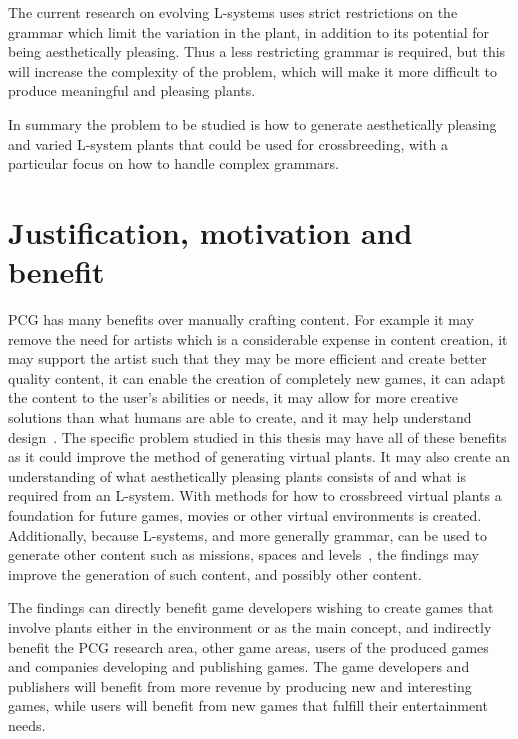The current research on evolving \glspl{L-system} uses strict restrictions on the grammar which limit the variation in the plant, in addition to its potential for being aesthetically pleasing. %
Thus a less restricting grammar is required, but this will increase the complexity of the problem, which will make it more difficult to produce meaningful and pleasing plants.

In summary the problem to be studied is how to generate aesthetically pleasing and varied \gls{L-system} plants that could be used for crossbreeding, with a particular focus on how to handle complex grammars.

\section{Justification, motivation and benefit}
\gls{PCG} has many benefits over manually crafting content.
For example it may remove the need for artists which is a considerable expense in content creation, it may support the artist such that they may be more efficient and create better quality content, it can enable the creation of completely new games, it can adapt the content to the user's abilities or needs, it may allow for more creative solutions than what humans are able to create, and it may help understand design~\cite{PCG_1}.
The specific problem studied in this thesis may have all of these benefits as it could improve the method of generating virtual plants.
It may also create an understanding of what aesthetically pleasing plants consists of and what is required from an \gls{L-system}.
With methods for how to crossbreed virtual plants a foundation for future games, movies or other virtual environments is created.
Additionally, because \glspl{L-system}, and more generally grammar, can be used to generate other content such as missions, spaces and levels~\cite{PCG_5}, the findings may improve the generation of such content, and possibly other content.

The findings can directly benefit game developers wishing to create games that involve plants either in the environment or as the main concept, and indirectly benefit the \gls{PCG} research area, other game areas, users of the produced games and companies developing and publishing games.
The game developers and publishers will benefit from more revenue by producing new and interesting games, while users will benefit from new games that fulfill their entertainment needs.

